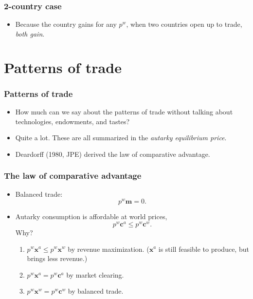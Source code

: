 \documentclass[compress,mathserif,aspectratio=169]{beamer}
\begin{document}
\begin{frame}\frametitle{2-country case}\hypertarget{2-country case}{}
\begin{itemize}
\item Because the country gains for any $p^w$, when two countries open up to trade, \emph{both gain}.










\end{itemize}
\end{frame}







\section{Patterns of trade}\hypertarget{Patterns of trade}{}
\begin{frame}\frametitle{Patterns of trade}\hypertarget{Patterns of trade}{}
\begin{itemize}
\item How much can we say about the patterns of trade without talking about technologies, endowments, and tastes?

\item Quite a lot. These are all summarized in the \emph{autarky equilibrium price}.

\item Deardorff (1980, JPE) derived the law of comparative advantage.


\end{itemize}
\end{frame}



\begin{frame}\frametitle{The law of comparative advantage}\hypertarget{The law of comparative advantage}{}
\begin{itemize}
\item Balanced trade:
\[
p^w \mathbf m = 0.
\]

\item Autarky consumption is affordable at world prices,
\[
p^w\mathbf c^a \le p^w\mathbf c^w.
\]
Why?
\pause


\begin{enumerate}\setcounter{enumi}{0}
\item $p^w\mathbf x^a\le p^w\mathbf x^w$ by revenue maximization. ($\mathbf x^a$ is still feasible to produce, but brings less revenue.)

\item $p^w\mathbf x^a=p^w\mathbf c^a$ by market clearing.

\item $p^w\mathbf x^w=p^w\mathbf c^w$ by balanced trade.




\end{enumerate}

\end{itemize}
\end{frame}
\end{document}
